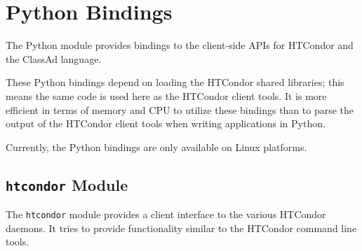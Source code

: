 \section{\label{API-Python} Python Bindings}

The Python module provides bindings to the client-side APIs for HTCondor and
the ClassAd language.

These Python bindings depend on loading the HTCondor shared libraries; this
means the same code is used here as the HTCondor client tools.  It is more
efficient in terms of memory and CPU to utilize these bindings than to parse
the output of the HTCondor client tools when writing applications in Python.

Currently, the Python bindings are only available on Linux platforms.

\subsection{\label{Python-OtherModule} \texttt{htcondor}  Module}
The \texttt{htcondor} module provides a client interface to the various 
HTCondor daemons. It tries to provide functionality similar to the HTCondor 
command line tools.

